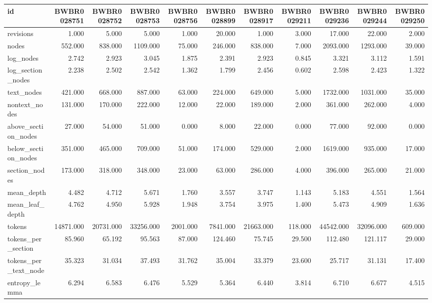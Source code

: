 \begin{tabular}{lrrrrrrrrrr}
\toprule
id & BWBR0028751 & BWBR0028752 & BWBR0028753 & BWBR0028756 & BWBR0028899 & BWBR0028917 & BWBR0029211 & BWBR0029236 & BWBR0029244 & BWBR0029250 \\
\midrule
revisions & 1.000 & 5.000 & 5.000 & 1.000 & 20.000 & 1.000 & 3.000 & 17.000 & 22.000 & 2.000 \\
\cline{1-11}
nodes & 552.000 & 838.000 & 1109.000 & 75.000 & 246.000 & 838.000 & 7.000 & 2093.000 & 1293.000 & 39.000 \\
\cline{1-11}
log\_nodes & 2.742 & 2.923 & 3.045 & 1.875 & 2.391 & 2.923 & 0.845 & 3.321 & 3.112 & 1.591 \\
\cline{1-11}
log\_section\_nodes & 2.238 & 2.502 & 2.542 & 1.362 & 1.799 & 2.456 & 0.602 & 2.598 & 2.423 & 1.322 \\
\cline{1-11}
text\_nodes & 421.000 & 668.000 & 887.000 & 63.000 & 224.000 & 649.000 & 5.000 & 1732.000 & 1031.000 & 35.000 \\
\cline{1-11}
nontext\_nodes & 131.000 & 170.000 & 222.000 & 12.000 & 22.000 & 189.000 & 2.000 & 361.000 & 262.000 & 4.000 \\
\cline{1-11}
above\_section\_nodes & 27.000 & 54.000 & 51.000 & 0.000 & 8.000 & 22.000 & 0.000 & 77.000 & 92.000 & 0.000 \\
\cline{1-11}
below\_section\_nodes & 351.000 & 465.000 & 709.000 & 51.000 & 174.000 & 529.000 & 2.000 & 1619.000 & 935.000 & 17.000 \\
\cline{1-11}
section\_nodes & 173.000 & 318.000 & 348.000 & 23.000 & 63.000 & 286.000 & 4.000 & 396.000 & 265.000 & 21.000 \\
\cline{1-11}
mean\_depth & 4.482 & 4.712 & 5.671 & 1.760 & 3.557 & 3.747 & 1.143 & 5.183 & 4.551 & 1.564 \\
\cline{1-11}
mean\_leaf\_depth & 4.762 & 4.950 & 5.928 & 1.948 & 3.754 & 3.975 & 1.400 & 5.473 & 4.909 & 1.636 \\
\cline{1-11}
tokens & 14871.000 & 20731.000 & 33256.000 & 2001.000 & 7841.000 & 21663.000 & 118.000 & 44542.000 & 32096.000 & 609.000 \\
\cline{1-11}
tokens\_per\_section & 85.960 & 65.192 & 95.563 & 87.000 & 124.460 & 75.745 & 29.500 & 112.480 & 121.117 & 29.000 \\
\cline{1-11}
tokens\_per\_text\_node & 35.323 & 31.034 & 37.493 & 31.762 & 35.004 & 33.379 & 23.600 & 25.717 & 31.131 & 17.400 \\
\cline{1-11}
entropy\_lemma & 6.294 & 6.583 & 6.476 & 5.529 & 5.364 & 6.440 & 3.814 & 6.710 & 6.677 & 4.515 \\

\end{tabular}
